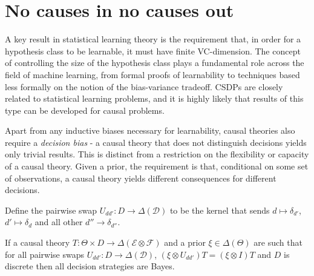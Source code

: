 
\section{No causes in no causes out}

A key result in statistical learning theory is the requirement that, in order for a hypothesis class to be learnable, it must have finite VC-dimension. The concept of controlling the size of the hypothesis class plays a fundamental role across the field of machine learning, from formal proofs of learnability to techniques based less formally on the notion of the bias-variance tradeoff. CSDPs are closely related to statistical learning problems, and it is highly likely that results of this type can be developed for causal problems.

Apart from any inductive biases necessary for learnability, causal theories also require a \emph{decision bias} - a causal theory that does not distinguish decisions yields only trivial results. This is distinct from a restriction on the flexibility or capacity of a causal theory. Given a prior, the requirement is that, conditional on some set of observations, a causal theory yields different consequences for different decisions. 

Define the pairwise swap $U_{dd'}:D\to \Delta(\mathcal{D})$ to be the kernel that sends $d\mapsto \delta_{d'}$, $d'\mapsto \delta_d$ and all other $d''\to \delta_{d''}$.

\begin{theorem}\label{th:ncinco}
If a causal theory $T:\Theta\times D\to \Delta(\mathcal{E}\otimes\mathcal{F})$ and a prior $\xi\in \Delta(\Theta)$ are such that for all pairwise swaps $U_{dd'}:D\to \Delta(\mathcal{D})$, $(\xi\otimes U_{dd'})T = (\xi\otimes I)T$ and $D$ is discrete then all decision strategies are Bayes.
\end{theorem}

